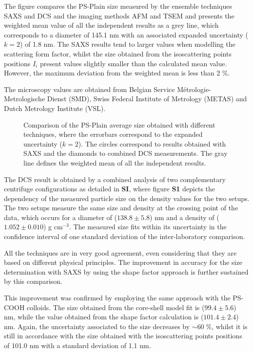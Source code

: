 The figure compares the PS-Plain size measured by the ensemble techniques SAXS and DCS and the imaging methods AFM and TSEM and presents the weighted mean value of all the independent results as a grey line, which corresponds to a diameter of 145.1 nm with an associated expanded uncertainty ($k=2$) of 1.8 nm. The SAXS results tend to larger values when modelling the scattering form factor, whilst the size obtained from the isoscattering points positions $I_i$ present values slightly smaller than the calculated mean value. However, the maximum deviation from the weighted mean is less than 2 $\%$.

The microscopy values are obtained from Belgian Service Métrologie-Metrologische Dienst (SMD), Swiss Federal Institute of Metrology (METAS) and Dutch Metrology Institute (VSL).

\begin{figure}
	\centering
		
	\caption{Comparison of the PS-Plain average size obtained with different techniques, where the errorbars correspond to the expanded uncertainty ($k=2$). The circles correspond to results obtained with SAXS and the diamonds to combined DCS measurements. The gray line defines the weighted mean of all the independent results.}
	\label{fig:PSPlainSizeComparison}
\end{figure}

The DCS result is obtained by a combined analysis of two complementary centrifuge configurations as detailed in \textbf{SI}, where figure \textbf{S1} depicts the dependency of the measured particle size on the density values for the two setups. The two setups measure the same size and density at the crossing point of the data, which occurs for a diameter of ($138.8\pm5.8$) nm and a density of ($1.052\pm0.010$) g cm$^{-3}$. The measured size fits within its uncertainty in the confidence interval of one standard deviation of the inter-laboratory comparison.
 
All the techniques are in very good agreement, even considering that they are based on different physical principles. The improvement in accuracy for the size determination with SAXS by using the shape factor approach is further sustained by this comparison. 

This improvement was confirmed by employing the same approach with the PS-COOH colloids. The size obtained from the core-shell model fit is ($99.4\pm5.6$) nm\citep{garcia-diez_nanoparticle_2015}, while the value obtained from the shape factor calculation is ($101.4\pm2.4$) nm. Again, the uncertainty associated to the size decreases by $\sim 60\;\%$, whilst it is still in accordance with the size obtained with the isoscattering points positions of 101.0 nm with a standard deviation of 1.1 nm. 

